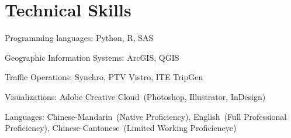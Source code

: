 \documentclass[12pt]{article}
\begin{document}
\section{Technical Skills}
Programming languages: Python, R, SAS

Geographic Information Systems: ArcGIS, QGIS

Traffic Operations: Synchro, PTV Vistro, ITE TripGen

Visualizations: Adobe Creative Cloud\ (Photoshop, Illustrator, InDesign)

Languages: Chinese-Mandarin\ (Native Proficiency), English\ (Full Professional Proficiency), Chinese-Cantonese\ (Limited Working Proficiencye)
\end{document}
